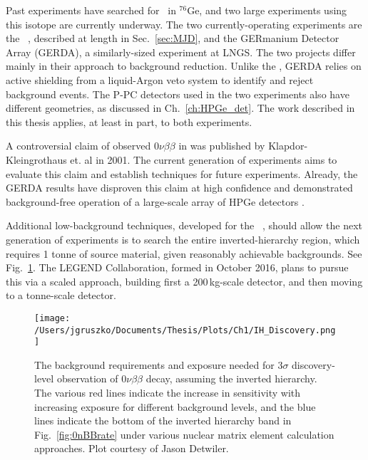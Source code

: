 Past experiments have searched for \nonubb\ in $^{76}$Ge, and two large experiments using this isotope are currently underway. The two currently-operating experiments are the \MJ\ \DEM, described at length in Sec.~\ref{sec:MJD}, and the GERmanium Detector Array (GERDA), a similarly-sized experiment at LNGS. The two projects differ mainly in their approach to background reduction. Unlike the \DEM, GERDA relies on active shielding from a liquid-Argon veto system to identify and reject background events\cite{GERDA_Device2013}. The P-PC detectors used in the two experiments also have different geometries, as discussed in Ch.~\ref{ch:HPGe_det}. The work described in this thesis applies, at least in part, to both experiments. 

A controversial claim of observed $0\nu\beta\beta$ in  was published by Klapdor-Kleingrothaus et. al in 2001\cite{KK2001}. The current generation of experiments aims to evaluate this claim and establish techniques for future experiments. Already, the GERDA results have disproven this claim at high confidence and demonstrated background-free operation of a large-scale array of HPGe detectors \cite{GERDA2017}. 

Additional low-background techniques, developed for the \MJ\ \DEM, should allow the next generation of experiments is to search the entire inverted-hierarchy region, which requires 1 tonne of source material, given reasonably achievable backgrounds. See Fig.~\ref{IH_Discovery}. The LEGEND Collaboration, formed in October 2016, plans to pursue this via a scaled approach, building first a 200\,kg-scale detector, and then moving to a tonne-scale detector.    

\begin{figure}[]
\texttt{[image: /Users/jgruszko/Documents/Thesis/Plots/Ch1/IH\_Discovery.png]}
\caption[The background requirements and exposure needed for $3\sigma$ discovery-level observation of $0\nu\beta\beta$ decay in the IH]{The background requirements and exposure needed for $3\sigma$ discovery-level observation of $0\nu\beta\beta$ decay, assuming the inverted hierarchy. The various red lines indicate the increase in sensitivity with increasing exposure for different background levels, and the blue lines indicate the bottom of the inverted hierarchy band in Fig.~\ref{fig:0nBBrate} under various nuclear matrix element calculation approaches. Plot courtesy of Jason Detwiler.}
\label{IH_Discovery}
\end{figure}

